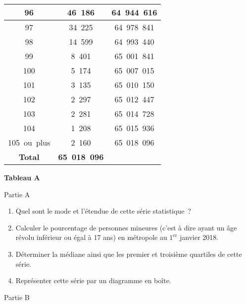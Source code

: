 \begin{center}
\begin{tabular}{|c|c|c|}
          96  &  46~186  &  64~944~616 \\ \hline
          97  &  34~225  &  64~978~841 \\ \hline
          98  &  14~599  &  64~993~440 \\ \hline
          99  &  8~401  &  65~001~841 \\ \hline
          100  &  5~174  &  65~007~015 \\ \hline
          101  &  3~135  &  65~010~150 \\ \hline
          102  &  2~297  &  65~012~447 \\ \hline
          103  &  2~281  &  65~014~728 \\ \hline
          104  &  1~208  &  65~015~936 \\ \hline
          105~ou~plus  &  2~160  &  65~018~096 \\ \hline
          \textbf{Total}  &  \textbf{65~018~096} &\\ \hline
     \end{tabular}
     \textbf{Tableau A}
\end{center}
%
\begin{center}\begin{h3}Partie A \end{h3}\end{center}
%
\begin{enumerate}
     \item %
     Quel sont le mode et l'étendue de cette série statistique~?
     \item %
     Calculer le pourcentage de personnes mineures (c'est à dire ayant un âge révolu inférieur ou égal à 17 ans) en métropole au $1^\text{er}$ janvier 2018.
     \item %
     Déterminer la médiane ainsi que les premier et troisième quartiles de cette série.
     \item %
     Représenter cette série par un diagramme en boîte.
\end{enumerate}
%
\begin{center}\begin{h3}Partie B \end{h3}\end{center}
